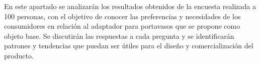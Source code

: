 \tab En este apartado se analizarán los resultados obtenidos de la encuesta realizada a 100 personas, con el objetivo de conocer las preferencias y necesidades de los consumidores en relación al adaptador para portavasos que se propone como objeto base. Se discutirán las respuestas a cada pregunta y se identificarán patrones y tendencias que puedan ser útiles para el diseño y comercialización del producto.